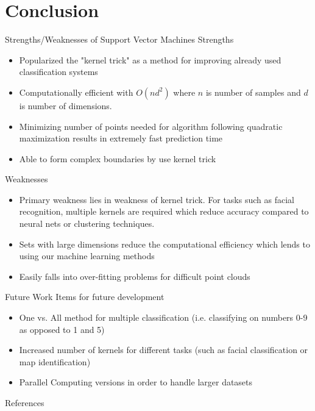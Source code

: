 \documentclass{beamer}
\begin{document}
\section{Conclusion}

\begin{frame}{Strengths/Weaknesses of Support Vector Machines}
Strengths
\begin{itemize}
\item Popularized the "kernel trick" as a method for improving already used classification systems
\item Computationally efficient with $O(nd^2)$ where $n$ is number of samples and $d$ is number of dimensions.
\item Minimizing number of points needed for algorithm following quadratic maximization results in extremely fast prediction time
\item Able to form complex boundaries by use kernel trick
\end{itemize}
Weaknesses
\begin{itemize}
\item Primary weakness lies in weakness of kernel trick. For tasks such as facial recognition, multiple kernels are required which reduce accuracy compared to neural nets or clustering techniques.
\item Sets with large dimensions reduce the computational efficiency which lends to using our machine learning methods
\item Easily falls into over-fitting problems for difficult point clouds
\end{itemize}
\end{frame}


\begin{frame}{Future Work}
Items for future development
\begin{itemize}
\item One vs. All method for multiple classification (i.e. classifying on numbers 0-9 as opposed to 1 and 5)
\item Increased number of kernels for different tasks (such as facial classification or map identification)
\item Parallel Computing versions in order to handle larger datasets
\end{itemize}
\end{frame}



\begin{frame}{References}


\end{frame}
\end{document}
